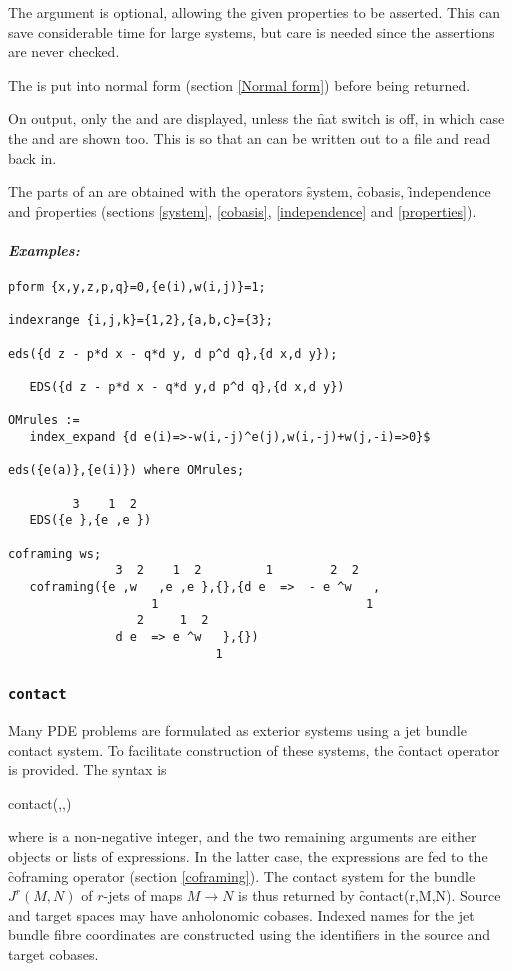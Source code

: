 The  argument is optional, allowing the given properties
to be asserted. This can save considerable time for large systems, but care
is needed since the assertions are never checked.

The  is put into normal form (section \ref{Normal form}) before
being returned.

On output, only the  and  are
displayed, unless the \f{nat} switch is off, in which case the
 and  are shown too. This is so that an
 can be written out to a file and read back in. 

The parts of an  are obtained with the operators \f{system},
\f{cobasis}, \f{independence} and \f{properties} (sections \ref{system},
\ref{cobasis}, \ref{independence} and \ref{properties}).

\paragraph{\it Examples:}
\begin{verbatim}
pform {x,y,z,p,q}=0,{e(i),w(i,j)}=1;

indexrange {i,j,k}={1,2},{a,b,c}={3};

eds({d z - p*d x - q*d y, d p^d q},{d x,d y});

   EDS({d z - p*d x - q*d y,d p^d q},{d x,d y}) 

OMrules := 
   index_expand {d e(i)=>-w(i,-j)^e(j),w(i,-j)+w(j,-i)=>0}$

eds({e(a)},{e(i)}) where OMrules;

         3    1  2
   EDS({e },{e ,e })

coframing ws;
               3  2    1  2         1        2  2 
   coframing({e ,w   ,e ,e },{},{d e  =>  - e ^w   ,
                    1                             1 
                  2     1  2 
               d e  => e ^w   },{})
                             1 
\end{verbatim}

\subsubsection{\tt contact}
\label{contact}

Many PDE problems are formulated as exterior systems using a jet bundle
contact system. To facilitate construction of these systems, the
\f{contact} operator is provided. The syntax is
\begin{edssyntax}
	contact(,,)
\end{edssyntax}
where  is a non-negative integer, and the two remaining
arguments are either  objects or lists of 
expressions. In the latter case, the expressions are fed to the
\f{coframing} operator (section \ref{coframing}). The contact system for the
bundle $J^r(M,N)$ of $r$-jets of maps $M\to N$ is thus returned by
\f{contact(r,M,N)}. Source and target spaces may have anholonomic
cobases. Indexed names for the jet bundle fibre coordinates are constructed
using the identifiers in the source and target cobases.

